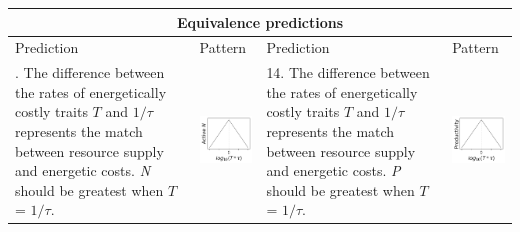 \documentclass{article}
\begin{document}
\begin{table}
\begin{tabularx}{\textwidth}{m{5.6cm} m{3.4cm} m{5.6cm} m{3.4cm}}
\hline
\toprule
\multicolumn{4}{c}{Equivalence predictions} \\ 
\midrule
\hline
\toprule
Prediction & Pattern & Prediction & Pattern\\ [0.5ex]
\midrule

\addlinespace
13. The difference between the rates of energetically costly traits $T$ and $1/\tau$ represents the match between resource supply and energetic costs. \textit{N} should be greatest when $T$ = $1/\tau$.
&
\begin{minipage}{.3\textwidth}
\includegraphics[width=30mm, height=25mm]{predictions/N-equiv}
\end{minipage}
&
14. The difference between the rates of energetically costly traits $T$ and $1/\tau$ represents the match between resource supply and energetic costs. \textit{P} should be greatest when $T$ = $1/\tau$.
&
\begin{minipage}{.3\textwidth}
\includegraphics[width=30mm, height=25mm]{predictions/P-equiv}
\end{minipage} \\
\hline

\end{tabularx}
\end{table}
\end{document}
